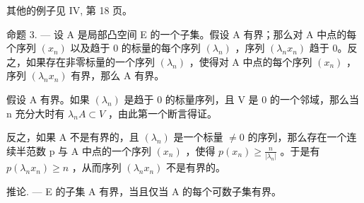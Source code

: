 其他的例子见 IV, 第 18 页。

命题 3. --- 设 A 是局部凸空间 E 的一个子集。假设 A 有界；那么对 A 中点的每个序列 \((x_{n})\) 以及趋于 0 的标量的每个序列 \((\lambda_{n})\) ，序列 \((\lambda_{n}x_{n})\) 趋于 0。反之，如果存在非零标量的一个序列 \((\lambda_{n})\) ，使得对 A 中点的每个序列 \((x_{n})\) ，序列 \((\lambda_{n}x_{n})\) 有界，那么 A 有界。

假设 A 有界。如果 \((\lambda_{n})\) 是趋于 0 的标量序列，且 V 是 0 的一个邻域，那么当 n 充分大时有 \(\lambda_{n}A \subset V\) ，由此第一个断言得证。

反之，如果 A 不是有界的，且 \((\lambda_{n})\) 是一个标量 \(\neq 0\) 的序列，那么存在一个连续半范数 p 与 A 中点的一个序列 \((x_{n})\) ，使得 \(p(x_{n}) \geqslant \frac{n}{|\lambda_{n}|}\) 。于是有 \(p(\lambda_{n}x_{n}) \geqslant n\) ，从而序列 \((\lambda_{n}x_{n})\) 不是有界的。

推论. --- E 的子集 A 有界，当且仅当 A 的每个可数子集有界。

